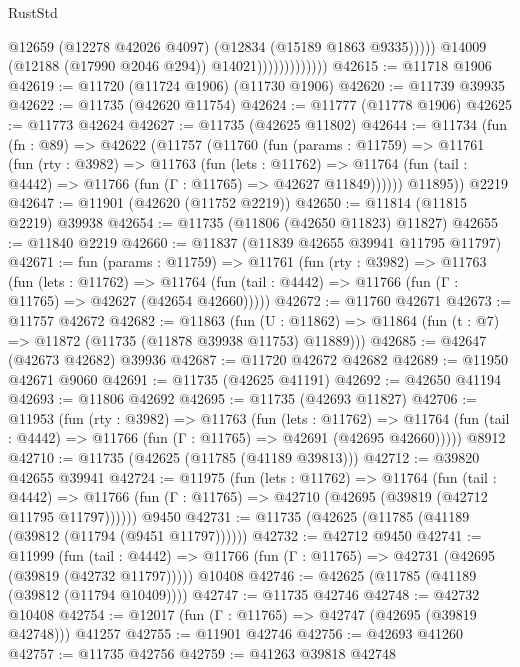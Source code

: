 \begin{lexlean}{RustStd}
\begin{coremodule}
                                    @12659
                                    (@12278 @42026 @4097)
                                    (@12834 (@15189 @1863 @9335)))))
                              @14009
                              (@12188 (@17990 @2046 @294))
                              @14021)))))))))))))
@42615 := @11718 @1906
@42619 := @11720 (@11724 @1906) (@11730 @1906)
@42620 := @11739 @39935
@42622 := @11735 (@42620 @11754)
@42624 := @11777 (@11778 @1906)
@42625 := @11773 @42624
@42627 := @11735 (@42625 @11802)
@42644 := @11734
    (fun (fn : @89) =>
    @42622
      (@11757
        (@11760
          (fun (params : @11759) =>
          @11761
            (fun (rty : @3982) =>
            @11763
              (fun (lets : @11762) =>
              @11764 (fun (tail : @4442) => @11766 (fun (Γ : @11765) => @42627 @11849))))))
        @11895))
    @2219
@42647 := @11901 (@42620 (@11752 @2219))
@42650 := @11814 (@11815 @2219) @39938
@42654 := @11735 (@11806 (@42650 @11823) @11827)
@42655 := @11840 @2219
@42660 := @11837 (@11839 @42655 @39941 @11795 @11797)
@42671 := fun (params : @11759) =>
  @11761
    (fun (rty : @3982) =>
    @11763
      (fun (lets : @11762) =>
      @11764 (fun (tail : @4442) => @11766 (fun (Γ : @11765) => @42627 (@42654 @42660)))))
@42672 := @11760 @42671
@42673 := @11757 @42672
@42682 := @11863
    (fun (U : @11862) => @11864 (fun (t : @7) => @11872 (@11735 (@11878 @39938 @11753) @11889)))
@42685 := @42647 (@42673 @42682) @39936
@42687 := @11720 @42672 @42682
@42689 := @11950 @42671 @9060
@42691 := @11735 (@42625 @41191)
@42692 := @42650 @41194
@42693 := @11806 @42692
@42695 := @11735 (@42693 @11827)
@42706 := @11953
    (fun (rty : @3982) =>
    @11763
      (fun (lets : @11762) =>
      @11764 (fun (tail : @4442) => @11766 (fun (Γ : @11765) => @42691 (@42695 @42660)))))
    @8912
@42710 := @11735 (@42625 (@11785 (@41189 @39813)))
@42712 := @39820 @42655 @39941
@42724 := @11975
    (fun (lets : @11762) =>
    @11764
      (fun (tail : @4442) =>
      @11766 (fun (Γ : @11765) => @42710 (@42695 (@39819 (@42712 @11795 @11797))))))
    @9450
@42731 := @11735 (@42625 (@11785 (@41189 (@39812 (@11794 (@9451 @11797))))))
@42732 := @42712 @9450
@42741 := @11999
    (fun (tail : @4442) => @11766 (fun (Γ : @11765) => @42731 (@42695 (@39819 (@42732 @11797)))))
    @10408
@42746 := @42625 (@11785 (@41189 (@39812 (@11794 @10409))))
@42747 := @11735 @42746
@42748 := @42732 @10408
@42754 := @12017 (fun (Γ : @11765) => @42747 (@42695 (@39819 @42748))) @41257
@42755 := @11901 @42746
@42756 := @42693 @41260
@42757 := @11735 @42756
@42759 := @41263 @39818 @42748

\end{coremodule}
\end{lexlean}
